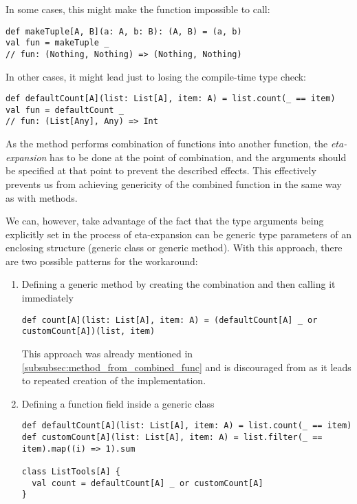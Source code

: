 In some cases, this might make the function impossible to call:
\lstset{style=Scala}
\begin{lstlisting}
def makeTuple[A, B](a: A, b: B): (A, B) = (a, b)
val fun = makeTuple _
// fun: (Nothing, Nothing) => (Nothing, Nothing)
\end{lstlisting}

In other cases, it might lead just to losing the compile-time type check:
\lstset{style=Scala}
\begin{lstlisting}
def defaultCount[A](list: List[A], item: A) = list.count(_ == item)
val fun = defaultCount _
// fun: (List[Any], Any) => Int
\end{lstlisting}

As the  method performs combination of functions into another function, the \textit{eta-expansion} has to be done at the point of combination, and the arguments should be specified at that point to prevent the described effects. This effectively prevents us from achieving genericity of the combined function in the same way as with methods. 

We can, however, take advantage of the fact that the type arguments being explicitly set in the process of eta-expansion can be generic type parameters of an enclosing structure (generic class or generic method). With this approach, there are two possible patterns for the workaround:

\begin{enumerate}
		\item Defining a generic method by creating the combination and then calling it immediately
	\lstset{style=Scala}
	\begin{lstlisting}
def count[A](list: List[A], item: A) = (defaultCount[A] _ or customCount[A])(list, item)
	\end{lstlisting}
	This approach was already mentioned in \ref{subsubsec:method_from_combined_func} and is discouraged from as it leads to repeated creation of the  implementation.
	\item Defining a function field inside a generic class
	\lstset{style=Scala}
	\begin{lstlisting}
def defaultCount[A](list: List[A], item: A) = list.count(_ == item)
def customCount[A](list: List[A], item: A) = list.filter(_ == item).map((i) => 1).sum

class ListTools[A] {
  val count = defaultCount[A] _ or customCount[A]
}
	\end{lstlisting}
\end{enumerate}

